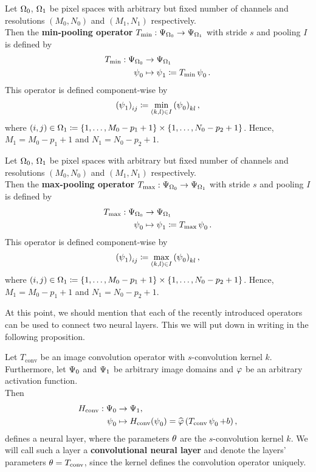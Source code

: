 \begin{definition}\label{def:min_pooling_op}
Let $\O_0$, $\O_1$ be pixel spaces with arbitrary but fixed number of channels and resolutions $(M_0,N_0)$ and $(M_1,N_1)$ respectively.\\
Then the \textbf{min-pooling operator} $T_{\text{min}}: \P_{\O_0} \to \P_{\O_1}$ with stride $s$ and pooling $I$ is defined by
\begin{align*}
T_{\text{min}}: \P_{\O_0} &\to \P_{\O_1} \\
\p_0 &\mapsto \p_1 \coloneqq T_{\text{min}}\p_0 .
\end{align*}
This operator is defined component-wise by
\begin{align}
\left(\p_1\right)_{ij} \coloneqq  \min_{(k,l)\in I} \left(\p_0\right)_{kl},
\end{align}
where $(i,j) \in \O_1 \coloneqq \{1,\ldots, M_0-p_1+1\} \times \{1,\ldots, N_0-p_2+1\}$. Hence, $M_1 = M_0-p_1+1$ and $N_1 = N_0-p_2+1$.
\end{definition}

\begin{definition}\label{def:max_pooling_op}
Let $\O_0$, $\O_1$ be pixel spaces with arbitrary but fixed number of channels and resolutions $(M_0,N_0)$ and $(M_1,N_1)$ respectively.\\
Then the \textbf{max-pooling operator} $T_{\text{max}}: \P_{\O_0} \to \P_{\O_1}$ with stride $s$ and pooling $I$ is defined by
\begin{align*}
T_{\text{max}}: \P_{\O_0} &\to \P_{\O_1} \\
\p_0 &\mapsto \p_1 \coloneqq T_{\text{max}}\p_0 .
\end{align*}
This operator is defined component-wise by
\begin{align}
\left(\p_1\right)_{ij} \coloneqq  \max_{(k,l)\in I} \left(\p_0\right)_{kl},
\end{align}
where $(i,j) \in \O_1 \coloneqq \{1,\ldots, M_0-p_1+1\} \times \{1,\ldots, N_0-p_2+1\}$. Hence, $M_1 = M_0-p_1+1$ and $N_1 = N_0-p_2+1$.
\end{definition}

At this point, we should mention that each of the recently introduced operators can be used to connect two neural layers. This we will put down in writing in the following proposition.

\begin{definition}\label{def:convolutional_layer}
Let $T_{\text{conv}}$ be an image convolution operator with $s$-convolution kernel $k$. Furthermore, let $\P_0$ and $\P_1$ be arbitrary image domains and $\f$ be an arbitrary activation function.\\
Then
\begin{align*}
H_{\text{conv}}: \P_0 &\to \P_1,\\
\p_0 &\mapsto H_{\text{conv}} (\p_0) = \hat{\f} \left(T_{\text{conv}} \p_0 + b \right),
\end{align*}
defines a neural layer, where the parameters $\t$ are the $s$-convolution kernel $k$. We will call such a layer a \textbf{convolutional neural layer} and denote the layers' parameters $\t = T_{\text{conv}}$, since the kernel defines the convolution operator uniquely.
\end{definition}
